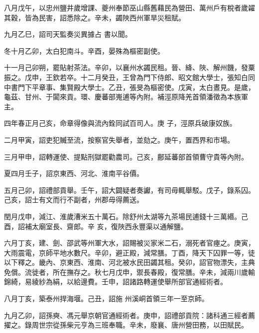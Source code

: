 \begin{pinyinscope}
 八月戊午，以忠州鹽井歲增課、夔州奉節巫山縣舊藉民為營田、萬州戶有稅者歲糴其穀，皆為民害，詔悉除之。辛未，蠲陜西州軍旱災租賦。



 九月乙巳，詔司天監奏災異據占
 書以聞。



 冬十月乙卯，太白犯南斗。辛酉，晏殊為樞密副使。



 十一月己卯朔，罷貼射茶法。辛卯，以襄州水蠲民租。晉、絳、陜、解州饑，發粟振之。戊申，王欽若卒。十二月癸丑，王曾為門下侍郎、昭文館大學士，張知白同中書門下平章事、集賢殿大學士。乙丑，張旻為樞密使。戊寅，太白晝見。是歲，龜茲、甘州、于闐來貢。環、慶蕃部嵬逋等內附。補涇原降羌首領潘徵為本族軍主。



 四年春正月己亥，命章得像與流內銓同試百司人。庚
 子，涇原兵破康奴族。



 二月甲寅，詔吏犯贓至流，按察官失舉者，並劾之。庚午，置西界和市場。



 三月甲申，詔轉運使、提點刑獄罷勸農司。己亥，鄜延蕃部首領曹守貴等內附。



 夏四月壬子，詔京東西、河北、淮南平谷價。



 五月己卯，詔禮部貢舉。壬午，詔大闢疑者奏讞，有司毋輒舉駁。戊子，錄系囚。己亥，詔士有文而行不副者，州郡毋得薦送。



 閏月戊申，減江、淮歲漕米五十萬石。除舒州太湖等九茶場民逋錢十三萬緡。己酉，詔補太廟室長、齋郎。辛
 亥，復陜西永豐渠以通解鹽。



 六月丁亥，建、劍、邵武等州軍大水，詔賜被災家米二石，溺死者官瘞之。庚寅，大雨震電，京師平地水數尺。辛卯，避正殿，減常膳。丁酉，降天下囚罪一等，徒以下釋之。畿內、京東西、淮南、河北被水民田蠲其租。癸卯，詔官物漂失，主典免償。流徙者，所在撫存之。秋七月戊申，禦長春殿，復常膳。辛未，減兩川歲輸錦綺，易綾紗為絹，以給邊費。壬申，詔諸路轉運使舉所部官通經術者。



 八月丁亥，築泰州捍海堰。己丑，詔施
 州溪峒首領三年一至京師。



 九月乙卯，詔孫奭、馮元舉京朝官通經術者。庚申，詔禮部貢院：諸科通三經者薦擢之。錄周世宗從孫柴元亨為三班奉職。辛未，廢襄、唐州營田務，以田賦民。




\end{pinyinscope}
